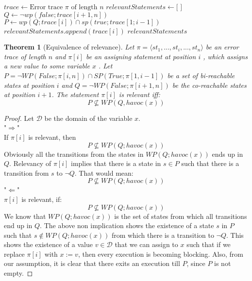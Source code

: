 \documentclass{article}
\newtheorem{theorem}{Theorem}
\begin{document}
\begin{algorithm}
\caption{Relevance of an assigning statement}\label{relevance}
\begin{algorithmic}[1]
\State $trace \gets \text{Error trace } \pi \text{ of length } \textit{n}$
\State $relevantStatements \gets \text{[ ]}$
\State $Q \gets \neg wp(false;trace[i+1,n])$
\State $P \gets wp(Q; trace[i]) \cap sp(true; trace[1;i-1])$
\State $relevantStatements.append(trace[i])$
\EndIf
\EndFor
\Return $relevantStatements$
\EndProcedure
\end{algorithmic}
\end{algorithm}
\begin{theorem}[Equivalence of relevance]\label{mydef:relevancytheorem}
Let $\pi = \langle st_1,...,st_i,...,st_n \rangle$ be an error trace of length $n$ and $\pi[i]$ be an assigning statement at position $i$ , which assigns a new value to some variable $x$ . Let $P = \neg WP(False; \pi[i,n]) \cap SP(True; \pi[1,i-1])$ be a set of bi-reachable states at position $i$ and $Q =  \neg WP(False; \pi[i+1,n])$ be the co-reachable states at position $i+1$. The statement $\pi[i]$ is relevant iff:
 $$P \not \subseteq WP(Q,havoc(x))$$
\end{theorem}

\begin{proof}
Let $\mathcal{D}$ be the domain of the variable $x$. \\
"$\Rightarrow$"\\
If $\pi[i]$ is relevant, then\\
$$P \not \subseteq WP(Q;havoc(x))$$
Obviously all the transitions from the states in $WP(Q;havoc(x))$ ends up in $Q$. Relevancy of $\pi[i]$ implies that there is a state in $s \in P$ such that there is a transition from $s$ to $\neg Q$. That would mean:
$$P \not \subseteq WP(Q;havoc(x))$$
"$\Leftarrow$"\\
$\pi[i]$ is relevant, if:
$$P \not \subseteq WP(Q;havoc(x))$$
We know that $WP(Q;havoc(x))$ is the set of states from which all transitions end up in $Q$. The above non implication shows the existence of a state $s$ in $P$ such that $s \not \in WP(Q; havoc(x))$  from which there is a transition to $\neg Q$. This shows the existence of a value $v \in \mathcal{D}$ that we can assign to $x$ such that if we replace $\pi[i]$ with $x:=v$, then every execution is becoming blocking. Also, from our assumption, it is clear that there exits an execution till $P$, since $P$ is not empty.
\end{proof}
\end{document}
